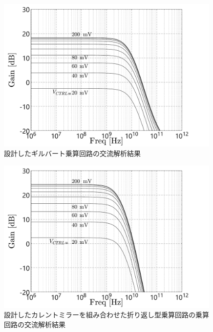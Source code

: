         \begin{figure}[!b]
            \centering
            \includegraphics[width=0.99\textwidth]{figures/chapter3/previous_ac_com.pdf}
            \caption{設計したギルバート乗算回路の交流解析結果}
            \label{fig:3_previous_ac_com}
        \end{figure}
        \begin{figure}[!b]
            \centering
            \includegraphics[width=0.99\textwidth]{figures/chapter3/folded_mirror_ac_com.pdf}
            \caption{設計したカレントミラーを組み合わせた折り返し型乗算回路の乗算回路の交流解析結果}
            \label{fig:3_folded_mirror_ac_com}
        \end{figure}

        


